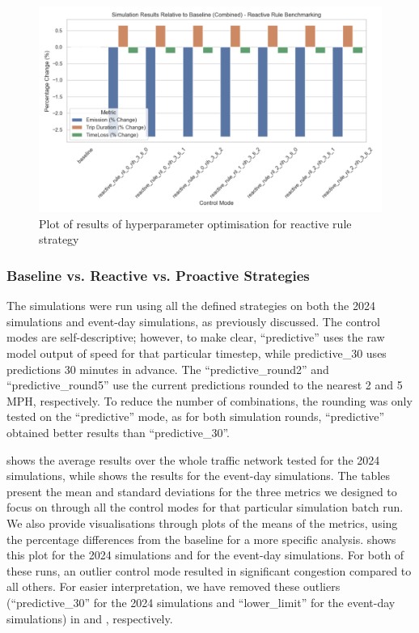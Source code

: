 \begin{figure}[!ht]
  \centering
  \includegraphics[width=\textwidth]{images/results-discussions/reactive-bench.pdf}
  \caption{Plot of results of hyperparameter optimisation for reactive rule strategy}
  \label{fig:reactive-bench-results}
\end{figure}

\subsubsection{Baseline vs. Reactive vs. Proactive Strategies}
The simulations were run using all the defined strategies on both the 2024 simulations and event-day simulations, as previously discussed. The control modes are self-descriptive; however, to make clear, “predictive” uses the raw model output of speed for that particular timestep, while predictive\_30 uses predictions 30 minutes in advance. The “predictive\_round2” and “predictive\_round5” use the current predictions rounded to the nearest 2 and 5 MPH, respectively. To reduce the number of combinations, the rounding was only tested on the “predictive” mode, as for both simulation rounds, “predictive” obtained better results than “predictive\_30”.

 shows the average results over the whole traffic network tested for the 2024 simulations, while  shows the results for the event-day simulations. The tables present the mean and standard deviations for the three metrics we designed to focus on through all the control modes for that particular simulation batch run. We also provide visualisations through plots of the means of the metrics, using the percentage differences from the baseline for a more specific analysis.  shows this plot for the 2024 simulations and  for the event-day simulations. For both of these runs, an outlier control mode resulted in significant congestion compared to all others. For easier interpretation, we have removed these outliers (“predictive\_30” for the 2024 simulations and “lower\_limit” for the event-day simulations) in  and , respectively.

